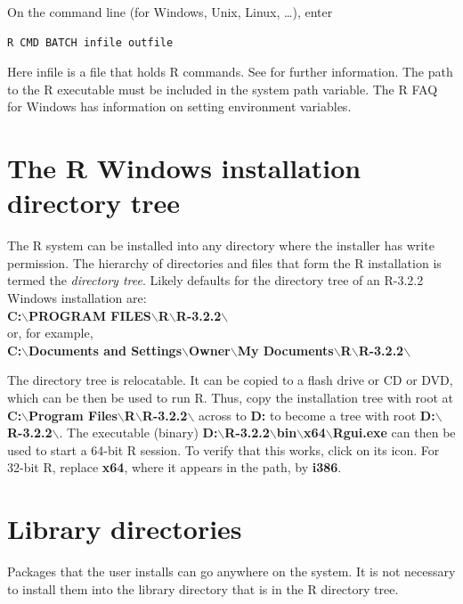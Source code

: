 On the command line (for Windows, Unix, Linux, \ldots), enter
\begin{verbatim}
R CMD BATCH infile outfile
\end{verbatim}

Here infile is a file that holds R commands.  See 
for further information. The path to the R executable must be included
in the system path variable. The R FAQ for Windows has information on
setting environment variables.

\section{The R Windows installation directory tree}

The R system can be installed into any directory where the installer
has write permission.  The hierarchy of directories and files that
form the R installation is termed the \textit{directory tree}.  Likely
defaults for the directory tree of an R-3.2.2 Windows installation are:\\
{\small \textbf{C:$\boldsymbol{\backslash}$PROGRAM FILES$\boldsymbol{\backslash}$R$\boldsymbol{\backslash}$R-3.2.2$\boldsymbol{\backslash}$}}\\
\noindent or, for example,\\
{\small \textbf{C:$\boldsymbol{\backslash}$Documents and
  Settings$\boldsymbol{\backslash}$Owner$\boldsymbol{\backslash}$My
  Documents$\boldsymbol{\backslash}$R$\boldsymbol{\backslash}$R-3.2.2$\boldsymbol{\backslash}$}}

The directory tree is relocatable.  It can be copied to a flash drive
or CD or DVD, which can be then be used to run R.
Thus, copy the installation tree with root at
\textbf{C:$\boldsymbol{\backslash}$Program
  Files$\boldsymbol{\backslash}$R$\boldsymbol{\backslash}$R-3.2.2$\boldsymbol{\backslash}$}
across to \textbf{D:} to become a tree with root
\textbf{D:$\boldsymbol{\backslash}$R-3.2.2$\boldsymbol{\backslash}$}.
The executable (binary)
\textbf{D:$\boldsymbol{\backslash}$R-3.2.2$\boldsymbol{\backslash}$bin$\boldsymbol{\backslash}$x64$\boldsymbol{\backslash}$Rgui.exe}
can then be used to start a 64-bit R session. To verify that this works,
click on its icon.
For 32-bit R, replace {\bf x64}, where it appears in the path, by {\bf i386}.

\section{Library directories}
Packages that the user installs can go anywhere on the system.
It is not necessary to install them into the library directory
that is in the R directory tree.


